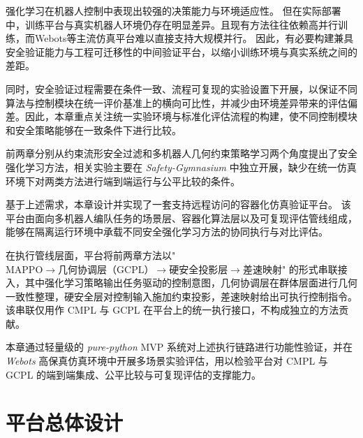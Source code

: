 
强化学习在机器人控制中表现出较强的决策能力与环境适应性。
但在实际部署中，训练平台与真实机器人环境仍存在明显差异。且现有方法往往依赖高并行训练，而Webots等主流仿真平台难以直接支持大规模并行。
因此，有必要构建兼具安全验证能力与工程可迁移性的中间验证平台，以缩小训练环境与真实系统之间的差距。

同时，安全验证过程需要在条件一致、流程可复现的实验设置下开展，以保证不同算法与控制模块在统一评价基准上的横向可比性，并减少由环境差异带来的评估偏差。因此，本章重点关注统一实验环境与标准化评估流程的构建，使不同控制模块和安全策略能够在一致条件下进行比较。

前两章分别从约束流形安全过滤和多机器人几何约束策略学习两个角度提出了安全强化学习方法，相关实验主要在 \textit{Safety-Gymnasium} 中独立开展，缺少在统一仿真环境下对两类方法进行端到端运行与公平比较的条件。

基于上述需求，本章设计并实现了一套支持远程访问的容器化仿真验证平台。
该平台由面向多机器人编队任务的场景层、容器化算法层以及可复现评估管线组成，能够在隔离运行环境中承载不同安全强化学习方法的协同执行与对比评估。

在执行管线层面，平台将前两章方法以"$\text{MAPPO} \rightarrow \text{几何协调层（GCPL）} \rightarrow \text{硬安全投影层} \rightarrow \text{差速映射}$"
的形式串联接入，其中强化学习策略输出任务驱动的控制意图，几何协调层在群体层面进行几何一致性整理，硬安全层对控制输入施加约束投影，差速映射给出可执行控制指令。该串联仅用作 CMPL 与 GCPL 在平台上的统一执行接口，不构成独立的方法贡献。

本章通过轻量级的 \textit{pure-python} MVP 系统对上述执行链路进行功能性验证，并在 \textit{Webots} 高保真仿真环境中开展多场景实验评估，用以检验平台对 CMPL 与 GCPL 的端到端集成、公平比较与可复现评估的支撑能力。

\section{平台总体设计}



